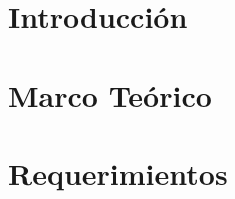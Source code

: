 \documentclass[10pt]{book}
\begin{document}
\renewcommand{\listtablename}{Índice de tablas}
\renewcommand{\tablename}{Tabla} 

\thispagestyle{empty}

\maketitle
 

\frontmatter
\tableofcontents
\listoffigures
\mainmatter

 \hideControlVersion
 
\chapter{Introducción}\label{chp:introduccion}
   
\chapter{Marco Teórico}\label{chp:marcoTeorico}
    
\chapter{Requerimientos}\label{chp:requerimientos}

\end{document}
